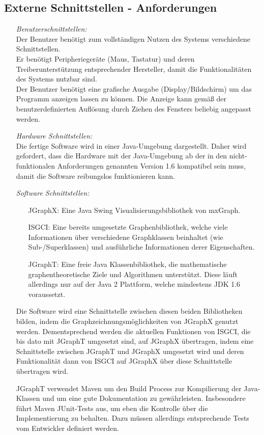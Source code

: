 \documentclass[11pt,a4paper]{article}
\begin{document}
	\subsection{Externe Schnittstellen - Anforderungen} %
	\begin{itemize}
	\item[] \textit{Benutzerschnittstellen:}\\
	Der Benutzer benötigt zum vollständigen Nutzen des Systems verschiedene Schnittstellen.\\
	Er benötigt Peripheriegeräte (Maus, Tastatur) und deren Treiberunterstützung entsprechender Hersteller, damit die Funktionalitäten des Systems nutzbar sind.\\
	Der Benutzer benötigt eine grafische Ausgabe (Display/Bildschirm) um das Programm anzeigen lassen zu können. Die Anzeige kann gemäß der benutzerdefinierten Auflösung durch Ziehen des Fensters beliebig angepasst werden.
	\item[] \textit{Hardware Schnittstellen:}\\
	Die fertige Software wird in einer Java-Umgebung dargestellt. Daher wird gefordert, dass die Hardware mit der Java-Umgebung ab der in den nicht-funktionalen Anforderungen genannten Version 1.6 kompatibel sein muss, damit die Software reibungslos funktionieren kann.
	\item[] \textit{Software Schnittstellen:}
	\begin{itemize}
	\item[JGraphX:] Eine Java Swing Visualisierungsbibliothek von mxGraph. 
	\item[ISGCI:] Eine bereits umgesetzte Graphenbibliothek, welche viele Informationen über verschiedene Graphklassen beinhaltet (wie Sub-/Superklassen) und ausführliche Informationen derer Eigenschaften.
	\item[JGraphT:] Eine freie Java Klassenbibliothek, die mathematische graphentheoretische Ziele und Algorithmen unterstützt. Diese läuft allerdings nur auf der Java 2 Plattform, welche mindestens JDK 1.6 voraussetzt.
 	\end{itemize}
	Die Software wird eine Schnittstelle zwischen diesen beiden Bibliotheken bilden, indem die Graphzeichnungsmöglichkeiten von JGraphX genutzt werden. Dementsprechend werden die aktuellen Funktionen von ISGCI, die bis dato mit JGraphT umgesetzt sind, auf JGraphX übertragen, indem eine Schnittstelle zwischen JGraphT und JGraphX umgesetzt wird und deren Funktionalität dann von ISGCI auf JGraphX über diese Schnittstelle übertragen wird. 
	
	JGraphT verwendet Maven um den Build Process zur Kompilierung der Java-Klassen und um eine gute Dokumentation zu gewährleisten. Insbesondere führt Maven JUnit-Tests aus, um eben die Kontrolle über die Implementierung zu behalten. Dazu müssen allerdings entsprechende Tests vom Entwickler definiert werden.
	\end{itemize}
	
\end{document}
